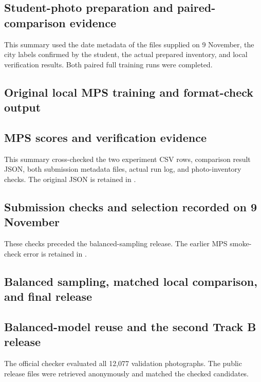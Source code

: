\documentclass[11pt]{article}
\begin{document}
\clearpage
\subsection*{Student-photo preparation and paired-comparison evidence}
This summary used the date metadata of the files supplied on 9 November,
the city labels confirmed by the student, the actual prepared inventory,
and local verification results. Both paired full training runs were completed.

\clearpage
\subsection*{Original local MPS training and format-check output}

\subsection*{MPS scores and verification evidence}
This summary cross-checked the two experiment CSV rows, comparison result
JSON, both submission metadata files, actual run log, and photo-inventory
checks. The original JSON is retained in
.

\clearpage
\subsection*{Submission checks and selection recorded on 9 November}
These checks preceded the balanced-sampling release. The earlier MPS
smoke-check error is retained in
.

\clearpage
\subsection*{Balanced sampling, matched local comparison, and final release}

\clearpage
\subsection*{Balanced-model reuse and the second Track B release}
The official checker evaluated all 12,077 validation photographs. The public
release files were retrieved anonymously and matched the checked candidates.
\end{document}
